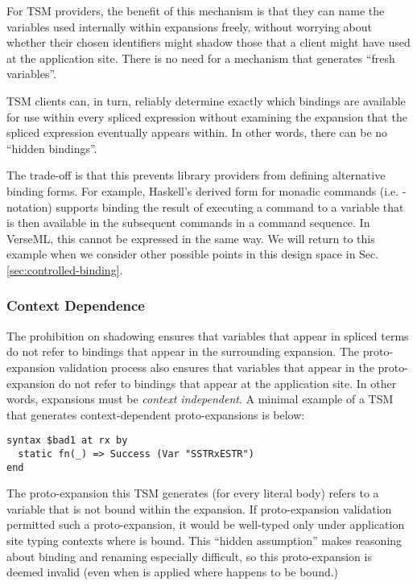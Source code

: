 For TSM providers, the benefit of this mechanism is that they can name the variables used internally within expansions freely, without worrying about whether their chosen identifiers might shadow those that a client might have used at the application site. There is no need for a mechanism that generates ``fresh variables''.

TSM clients can, in turn, reliably determine exactly which bindings are available for use within every spliced expression without examining the expansion that the spliced expression eventually appears within. In other words, there can be no ``hidden bindings''. 

The trade-off is that this prevents library providers from defining  alternative binding forms. For example, Haskell's derived form for monadic commands (i.e. -notation) supports binding the result of executing a command to a variable that is then available in the subsequent commands in a command sequence. In VerseML, this cannot be expressed in the same way. 
We will return to this example when we consider other possible points in this design space in Sec. \ref{sec:controlled-binding}.


\subsubsection{Context Dependence}
The prohibition on shadowing ensures that variables that appear in spliced terms do not refer to bindings that appear in the surrounding expansion. The proto-expansion validation process also ensures that variables that appear in the proto-expansion do not refer to bindings that appear at the application site. In other words, expansions must be \emph{context independent}. A minimal example of a TSM that generates context-dependent proto-expansions is below:
\begin{lstlisting}[numbers=none]
syntax $bad1 at rx by
  static fn(_) => Success (Var "SSTRxESTR")
end
\end{lstlisting}
The proto-expansion this TSM generates (for every literal body) refers to a variable  that is not bound within the expansion. If proto-expansion validation permitted such a proto-expansion, it would be well-typed only under application site typing contexts where  is bound. This ``hidden assumption'' makes reasoning about binding and renaming especially difficult, so this proto-expansion is deemed invalid (even when  is applied where  happens to be bound.)

